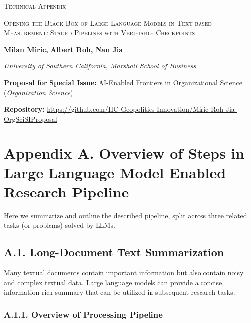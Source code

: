 \documentclass[11pt]{article}
\begin{document}
\begin{center}
    {\huge \textsc{Technical Appendix}\par}
    \vspace{1.2em}
    {\Large \textsc{Opening the Black Box of Large Language Models in Text-based Measurement: Staged Pipelines with Verifiable Checkpoints}\par}
    \vspace{1em}
    {\normalsize\bfseries Milan Miric, Albert Roh, Nan Jia\par}
    \vspace{0.2em}
    {\small\itshape University of Southern California, Marshall School of Business\par}
    \vspace{0.8em}
    {\footnotesize\textbf{Proposal for Special Issue:} AI-Enabled Frontiers in Organizational Science (\textit{Organization Science})\par}
    \vspace{0.3em}
    {\footnotesize\textbf{Repository:} \url{https://github.com/HC-Geopolitics-Innovation/Miric-Roh-Jia-OrgSciSIProposal}\par}
\end{center}

\vspace{1.5em}

\section*{Appendix A. Overview of Steps in Large Language Model Enabled Research Pipeline}

Here we summarize and outline the described pipeline, split across three related tasks (or problems) solved by LLMs.

\subsection*{A.1. Long-Document Text Summarization}

Many textual documents contain important information but also contain noisy and complex textual data. Large language models can provide a concise, information-rich summary that can be utilized in subsequent research tasks.

\subsubsection*{A.1.1. Overview of Processing Pipeline}
\end{document}
